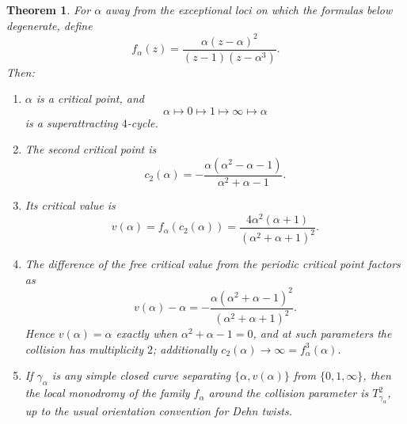 \documentclass[12pt]{article}
\newtheorem{theorem}{Theorem}[section]
\theoremstyle{definition}
\theoremstyle{remark}
\numberwithin{equation}{section}
\begin{document}
\begin{theorem}
\label{thm:normal-form}
For $\alpha$ away from the exceptional loci on which the formulas below
degenerate, define
\[
f_{\alpha}(z)=\frac{\alpha(z-\alpha)^{2}}{(z-1)(z-\alpha^{3})}.
\]
Then:
\begin{enumerate}[label=(\roman*)]
\item\label{it:nf-cycle} $\alpha$ is a critical point, and
\[
\alpha\longmapsto0\longmapsto1\longmapsto\infty\longmapsto\alpha
\]
is a superattracting $4$-cycle.
\item\label{it:nf-c2} The second critical point is
\[
c_{2}(\alpha)=-\frac{\alpha(\alpha^{2}-\alpha-1)}{\alpha^{2}+\alpha-1}.
\]
\item\label{it:nf-v} Its critical value is
\[
v(\alpha)=f_{\alpha}(c_{2}(\alpha))
=\frac{4\alpha^{2}(\alpha+1)}{(\alpha^{2}+\alpha+1)^{2}}.
\]
\item\label{it:nf-collision} The difference of the free critical value
from the periodic critical point factors as
\[
v(\alpha)-\alpha
=-\frac{\alpha(\alpha^{2}+\alpha-1)^{2}}{(\alpha^{2}+\alpha+1)^{2}}.
\]
Hence $v(\alpha)=\alpha$ exactly when $\alpha^{2}+\alpha-1=0$, and at
such parameters the collision has multiplicity $2$; additionally
$c_{2}(\alpha)\to\infty=f_{\alpha}^{3}(\alpha)$.
\item\label{it:nf-mono} If $\gamma_{\alpha}$ is any simple closed
curve separating $\{\alpha,v(\alpha)\}$ from $\{0,1,\infty\}$, then the
local monodromy of the family $f_{\alpha}$ around the collision
parameter is $T_{\gamma_{\alpha}}^{2}$, up to the usual orientation
convention for Dehn twists.
\end{enumerate}
\end{theorem}
\end{document}
